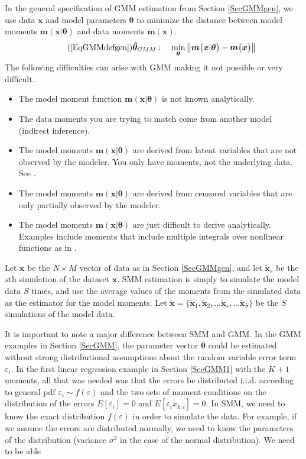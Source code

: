 \documentclass[letterpaper,12pt]{article}
\theoremstyle{definition}
\newcommand\ve{\varepsilon}
\newcommand\norm[1]{\left\lVert#1\right\rVert}
\begin{document}
    In the general specification of GMM estimation from Section \ref{SecGMMgen}, we use data $\bm{x}$ and model parameters $\bm{\theta}$ to minimize the distance between model moments $\bm{m}(\bm{x}|\bm{\theta})$ and data moments $\bm{m}(\bm{x})$.
    \begin{equation}\tag{\ref{EqGMMdefgen}}
      \bm{\hat{\theta}}_{GMM}:\quad \min_{\bm{\theta}}\norm{\bm{m}\bigl(\bm{x}|\bm{\theta}\bigr) - \bm{m}\bigl(\bm{x}\bigr)}
    \end{equation}
    The following difficulties can arise with GMM making it not possible or very difficult.
    \begin{itemize}
      \item The model moment function $\bm{m}(\bm{x}|\bm{\theta})$ is not known analytically.
      \item The data moments you are trying to match come from another model (indirect inference).
      \item The model moments $\bm{m}(\bm{x}|\bm{\theta})$ are derived from latent variables that are not observed by the modeler. You only have moments, not the underlying data. See \citet{LaroqueSalanie:1993}.
      \item The model moments $\bm{m}(\bm{x}|\bm{\theta})$ are derived from censored variables that are only partially observed by the modeler.
      \item The model moments $\bm{m}(\bm{x}|\bm{\theta})$ are just difficult to derive analytically. Examples include moments that include multiple integrals over nonlinear functions as in \citet{McFadden:1989}.
    \end{itemize}

    Let $\bm{x}$ be the $N\times M$ vector of data as in Section \ref{SecGMMgen}, and let $\bm{\tilde{x}}_s$ be the $s$th simulation of the dataset $\bm{x}$. SMM estimation is simply to simulate the model data $S$ times, and use the average values of the moments from the simulated data as the estimator for the model moments. Let $\bm{\tilde{x}}=\{\bm{\tilde{x}}_1,\bm{\tilde{x}}_2,...\bm{\tilde{x}}_s,...\bm{\tilde{x}}_S\}$ be the $S$ simulations of the model data.

    It is important to note a major difference between SMM and GMM. In the GMM examples in Section \ref{SecGMM}, the parameter vector $\bm{\theta}$ could be estimated without strong distributional assumptions about the random variable error term $\ve_i$. In the first linear regression example in Section \ref{SecGMM1} with the $K+1$ moments, all that was needed was that the errors be distributed i.i.d. according to general pdf $\ve_i\sim f(\ve)$ and the two sets of moment conditions on the distribution of the errors $E[\ve_i]=0$ and $E[\ve_i x_{k,i}]=0$. In SMM, we need to know the exact distribution $f(\ve)$ in order to simulate the data. For example, if we assume the errors are distributed normally, we need to know the parameters of the distribution (variance $\sigma^2$ in the case of the normal distribution). We need to be able
\end{document}

